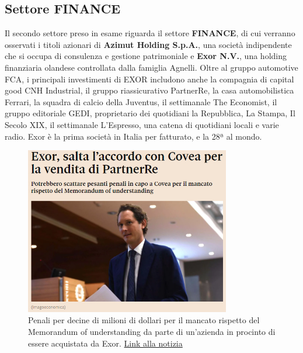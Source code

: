 \documentclass[12pt]{article}
\begin{document}
\subsection{Settore FINANCE}
Il secondo settore preso in esame riguarda il settore \textbf{FINANCE}, di cui verranno osservati i titoli azionari di \textbf{Azimut Holding S.p.A.}, una società indipendente che si occupa di consulenza e gestione patrimoniale e \textbf{Exor N.V.}, una holding finanziaria olandese controllata dalla famiglia Agnelli. Oltre al gruppo automotive FCA, i principali investimenti di EXOR includono anche la compagnia di capital good CNH Industrial, il gruppo riassicurativo PartnerRe, la casa automobilistica Ferrari, la squadra di calcio della Juventus, il settimanale The Economist, il gruppo editoriale GEDI, proprietario dei quotidiani la Repubblica, La Stampa, Il Secolo XIX, il settimanale L'Espresso, una catena di quotidiani locali e varie radio. Exor è la prima società in Italia per fatturato, e la 28ª al mondo.
\begin{figure}[!htb]
    \centering
    \includegraphics[width=0.8\textwidth]{immagini/exor.png}
    \caption{Penali per decine di milioni di dollari per il mancato rispetto del Memorandum of understanding da parte di un'azienda in procinto di essere acquistata da Exor. \href{https://www.ilsole24ore.com/art/exor-salta-l-accordo-covea-la-vendita-partnerre-ADhN48P}{Link alla notizia}}
\end{figure}
\FloatBarrier
\end{document}
